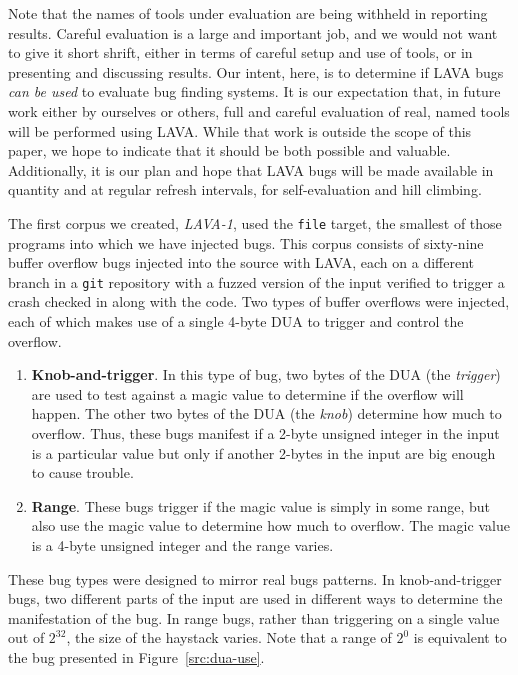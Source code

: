Note that the names of tools under evaluation are being withheld in reporting results.
Careful evaluation is a large and important job, and we would not want to give it short shrift, either in terms of careful setup and use of tools, or in presenting and discussing results.
Our intent, here, is to determine if LAVA bugs \emph{can be used} to evaluate bug finding systems. 
It is our expectation that, in future work either by ourselves or others, full and careful evaluation of real, named tools will be performed using LAVA.
While that work is outside the scope of this paper, we hope to indicate that it should be both possible and valuable. 
Additionally, it is our plan and hope that LAVA bugs will be made available in quantity and at regular refresh intervals, for self-evaluation and hill climbing.

The first corpus we created, \emph{LAVA-1}, used the \verb+file+ target, the smallest of those programs into which we have injected bugs.
This corpus consists of sixty-nine buffer overflow bugs injected into the source with LAVA, each on a different branch in a \verb+git+ repository with a fuzzed version of the input verified to trigger a crash checked in along with the code.
Two types of buffer overflows were injected, each of which makes use of a single 4-byte DUA to trigger and control the overflow.

\begin{enumerate}
    \item \textbf{Knob-and-trigger}. 
In this type of bug, two bytes of the DUA (the \emph{trigger}) are used to test against a magic value to determine if the overflow will happen.
The other two bytes of the DUA (the \emph{knob}) determine how much to overflow. 
Thus, these bugs manifest if a 2-byte unsigned integer in the input is a particular value but only if another 2-bytes in the input are big enough to cause trouble. 
    \item \textbf{Range}. 
These bugs trigger if the magic value is simply in some range, but also use the magic value to determine how much to overflow.
The magic value is a 4-byte unsigned integer and the range varies.  
\end{enumerate}

These bug types were designed to mirror real bugs patterns.  
In knob-and-trigger bugs, two different parts of the input are used in different ways to determine the manifestation of the bug.  
In range bugs, rather than triggering on a single value out of $2^{32}$, the size of the haystack varies.
Note that a range of $2^0$ is equivalent to the bug presented in Figure~\ref{src:dua-use}.

